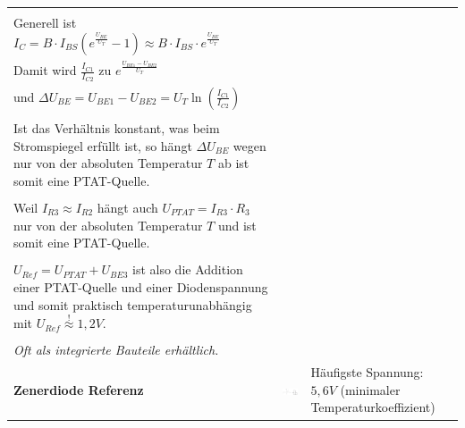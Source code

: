 \begin{longtable}{|l|l|l|}
\begin{minipage}{8cm}
			\textbf{Herleitung:} \\
			Generell ist $I_C = B \cdot I_{BS} \left(e^{\frac{U_{BE}}{U_T}} -1 \right)
							\approx B \cdot I_{BS} \cdot e^{\frac{U_{BE}}{U_T}}$ \\
			Damit wird $\frac{I_{C1}}{I_{C2}}$ zu $e^{\frac{U_{BE1}-U_{BE2}}{U_T}}$ \\
			und $\Delta U_{BE} = U_{BE1}-U_{BE2} = U_T \ln\left(\frac{I_{C1}}{I_{C2}}\right)$ \\
			\\
			Ist das Verhältnis \smash{$\frac{I_{C1}}{I_{C2}}$} konstant, was beim Stromspiegel
			erfüllt ist, so hängt $\Delta U_{BE}$ wegen \smash{$U_T=\frac{k \cdot T}{q}$} nur 
			von der absoluten Temperatur $T$ ab ist somit eine PTAT-Quelle. \\
			\\
			Weil $I_{R3} \approx I_{R2}$ hängt auch $U_{PTAT}=I_{R3} \cdot R_3$ nur von der
			absoluten Temperatur $T$ und ist somit eine PTAT-Quelle. \\
			\\
			$U_{Ref} = U_{PTAT} + U_{BE3}$ ist also die Addition einer PTAT-Quelle und einer
			Diodenspannung und somit praktisch temperaturunabhängig mit 
			$U_{Ref} \stackrel{!}{\approx} 1,2V$. \\
			\\
			\textit{Oft als integrierte Bauteile erhältlich.}
		\end{minipage}
	\\ \hline
		\begin{minipage}{4cm}
			\textbf{Zenerdiode Referenz}
		\end{minipage}
	&
		\begin{minipage}{6cm}
			\includegraphics[width=6cm,trim=0 0 0 -5]{pictures/zenerReferenz}
		\end{minipage}
	&
		\begin{minipage}{8cm}
			Häufigste Spannung: $5,6V$ (minimaler Temperaturkoeffizient)
		\end{minipage}
	\\ \hline
\end{longtable}

